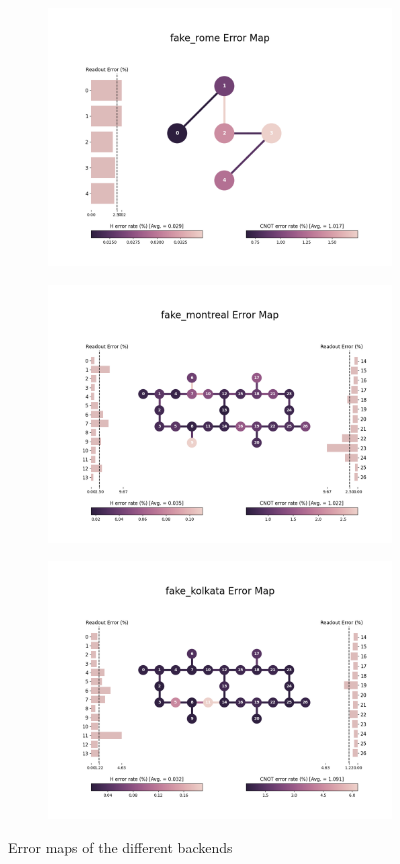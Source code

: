 \documentclass[11pt]{article}
\begin{document}
\begin{figure}[hbtp]
\begin{subfigure}{0.5\linewidth}
    \end{subfigure}
    \begin{subfigure}{0.5\linewidth}
        \centering
        \includegraphics[width=0.9\linewidth]{outputs/errormap_FakeRomeV2.png}
    \end{subfigure}
    \begin{subfigure}{0.5\linewidth}
        \centering
        \includegraphics[width=0.9\linewidth]{outputs/errormap_FakeMontrealV2.png}
    \end{subfigure}
    \begin{subfigure}{\linewidth}
        \centering
        \includegraphics[width=0.45\linewidth]{outputs/errormap_FakeKolkataV2.png}
    \end{subfigure}
    \caption{Error maps of the different backends}
    \label{fig:backends_errormap}
\end{figure}
\end{document}
